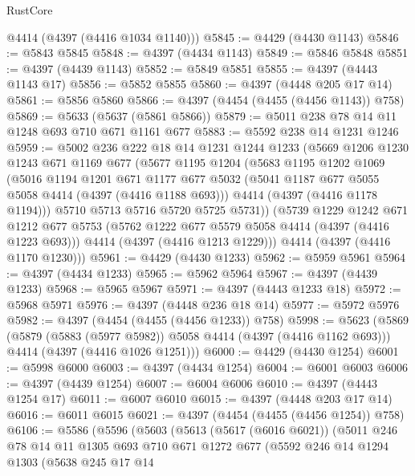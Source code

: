 \begin{lexlean}{RustCore}
\begin{coremodule}
      @4414
      (@4397 (@4416 @1034 @1140)))
@5845 := @4429 (@4430 @1143)
@5846 := @5843 @5845
@5848 := @4397 (@4434 @1143)
@5849 := @5846 @5848
@5851 := @4397 (@4439 @1143)
@5852 := @5849 @5851
@5855 := @4397 (@4443 @1143 @17)
@5856 := @5852 @5855
@5860 := @4397 (@4448 @205 @17 @14)
@5861 := @5856 @5860
@5866 := @4397 (@4454 (@4455 (@4456 @1143)) @758)
@5869 := @5633 (@5637 (@5861 @5866))
@5879 := @5011 @238 @78 @14 @11 @1248 @693 @710 @671 @1161 @677
@5883 := @5592 @238 @14 @1231 @1246
@5959 := @5002
    @236
    @222
    @18
    @14
    @1231
    @1244
    @1233
    (@5669
      @1206
      @1230
      @1243
      @671
      @1169
      @677
      (@5677
        @1195
        @1204
        (@5683
          @1195
          @1202
          @1069
          (@5016
            @1194
            @1201
            @671
            @1177
            @677
            @5032
            (@5041 @1187 @677 @5055 @5058 @4414 (@4397 (@4416 @1188 @693)))
            @4414
            (@4397 (@4416 @1178 @1194)))
          @5710
          @5713
          @5716
          @5720
          @5725
          @5731))
      (@5739
        @1229
        @1242
        @671
        @1212
        @677
        @5753
        (@5762 @1222 @677 @5579 @5058 @4414 (@4397 (@4416 @1223 @693)))
        @4414
        (@4397 (@4416 @1213 @1229)))
      @4414
      (@4397 (@4416 @1170 @1230)))
@5961 := @4429 (@4430 @1233)
@5962 := @5959 @5961
@5964 := @4397 (@4434 @1233)
@5965 := @5962 @5964
@5967 := @4397 (@4439 @1233)
@5968 := @5965 @5967
@5971 := @4397 (@4443 @1233 @18)
@5972 := @5968 @5971
@5976 := @4397 (@4448 @236 @18 @14)
@5977 := @5972 @5976
@5982 := @4397 (@4454 (@4455 (@4456 @1233)) @758)
@5998 := @5623
    (@5869
      (@5879 (@5883 (@5977 @5982)) @5058 @4414 (@4397 (@4416 @1162 @693)))
      @4414
      (@4397 (@4416 @1026 @1251)))
@6000 := @4429 (@4430 @1254)
@6001 := @5998 @6000
@6003 := @4397 (@4434 @1254)
@6004 := @6001 @6003
@6006 := @4397 (@4439 @1254)
@6007 := @6004 @6006
@6010 := @4397 (@4443 @1254 @17)
@6011 := @6007 @6010
@6015 := @4397 (@4448 @203 @17 @14)
@6016 := @6011 @6015
@6021 := @4397 (@4454 (@4455 (@4456 @1254)) @758)
@6106 := @5586
    (@5596
      (@5603
        (@5613
          (@5617 (@6016 @6021))
          (@5011
            @246
            @78
            @14
            @11
            @1305
            @693
            @710
            @671
            @1272
            @677
            (@5592
              @246
              @14
              @1294
              @1303
              (@5638
                @245
                @17
                @14

\end{coremodule}
\end{lexlean}
